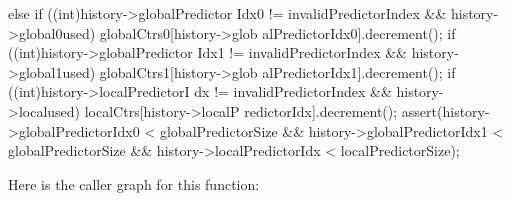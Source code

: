 \begin{DoxyCode}
{{{{{{                                        } else {
                                                if ((int)history->globalPredictor
      Idx0 != invalidPredictorIndex && history->global0used)
                                                        globalCtrs0[history->glob
      alPredictorIdx0].decrement();
                                                if ((int)history->globalPredictor
      Idx1 != invalidPredictorIndex && history->global1used)
                                                        globalCtrs1[history->glob
      alPredictorIdx1].decrement();
                                                if ((int)history->localPredictorI
      dx != invalidPredictorIndex && history->localused)
                                                        localCtrs[history->localP
      redictorIdx].decrement();
                                        }
                                }
                        }
                }
                assert(history->globalPredictorIdx0 < globalPredictorSize &&
                           history->globalPredictorIdx1 < globalPredictorSize &&
                       history->localPredictorIdx < localPredictorSize);
    }
}
\end{DoxyCode}


Here is the caller graph for this function:


